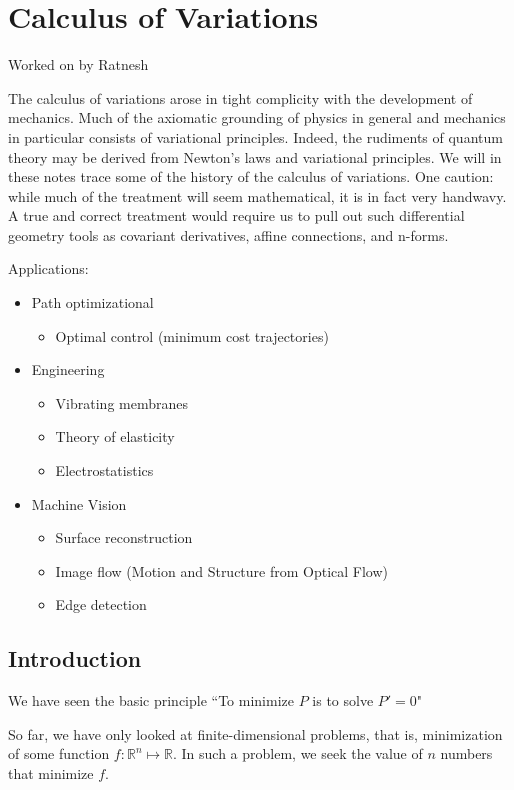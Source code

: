\chapter{Calculus of Variations}
Worked on by Ratnesh

The calculus of variations arose in tight complicity with the development of mechanics. 
Much of the axiomatic grounding of physics in general and mechanics in particular consists of variational principles. 
Indeed, the rudiments of quantum theory may be derived from Newton's laws and variational principles. 
We will in these notes trace some of the history of the calculus of variations. 
One caution: while much of the treatment will seem mathematical, it is in fact very handwavy. 
A true and correct treatment would require us to pull out such differential geometry tools as covariant derivatives, affine connections, and n-forms. 

Applications:
\begin{itemize}
    \item Path optimizational
       \begin{itemize}
            \item Optimal control (minimum cost trajectories)
        \end{itemize}
    \item Engineering
        \begin{itemize}
            \item Vibrating membranes
            \item Theory of elasticity
            \item Electrostatistics
        \end{itemize}
    \item Machine Vision
        \begin{itemize}
            \item Surface reconstruction
            \item Image flow (Motion and Structure from Optical Flow)
            \item Edge detection
        \end{itemize}    
\end{itemize}

\section{Introduction}
We have seen the basic principle ``To minimize $P$ is to solve $P' = 0$"

So far, we have only looked at finite-dimensional problems, that is, minimization of some function $f: \mathbb{R}^n \mapsto \mathbb{R}$. 
In such a problem, we seek the value of $n$ numbers that minimize $f$. 

